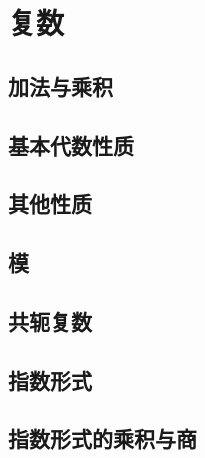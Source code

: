 \documentclass[a4paper, 11pt]{ctexbook}
\begin{document}
    \tableofcontents
    \chapter{复数}
        \section{加法与乘积}
        \section{基本代数性质}
            
        \section{其他性质}
        \section{模}
        \section{共轭复数}
            
        \section{指数形式}
        \section{指数形式的乘积与商}
            
\end{document}
